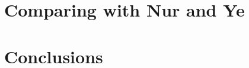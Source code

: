 \documentclass[11pt]{article}
\begin{document}
{	\section{Comparing with Nur and Ye}{


	}

	\section{Conclusions}{

	}
}



\end{document}
